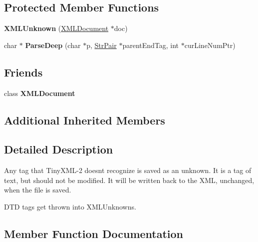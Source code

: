 \subsection*{Protected Member Functions}
\begin{DoxyCompactItemize}
\item 
\mbox{\label{classtinyxml2_1_1_x_m_l_unknown_a9391eb679598d50baba424e6f1aa367b}} 
{\bfseries X\+M\+L\+Unknown} (\mbox{\hyperlink{classtinyxml2_1_1_x_m_l_document}{X\+M\+L\+Document}} $\ast$doc)
\item 
\mbox{\label{classtinyxml2_1_1_x_m_l_unknown_aefc332cc1e6e25736f364d1e5eeb31fe}} 
char $\ast$ {\bfseries Parse\+Deep} (char $\ast$p, \mbox{\hyperlink{classtinyxml2_1_1_str_pair}{Str\+Pair}} $\ast$parent\+End\+Tag, int $\ast$cur\+Line\+Num\+Ptr)
\end{DoxyCompactItemize}
\subsection*{Friends}
\begin{DoxyCompactItemize}
\item 
\mbox{\label{classtinyxml2_1_1_x_m_l_unknown_a4eee3bda60c60a30e4e8cd4ea91c4c6e}} 
class {\bfseries X\+M\+L\+Document}
\end{DoxyCompactItemize}
\subsection*{Additional Inherited Members}


\subsection{Detailed Description}
Any tag that Tiny\+X\+M\+L-\/2 doesn\textquotesingle{}t recognize is saved as an unknown. It is a tag of text, but should not be modified. It will be written back to the X\+ML, unchanged, when the file is saved.

D\+TD tags get thrown into X\+M\+L\+Unknowns. 

\subsection{Member Function Documentation}
\mbox{\label{classtinyxml2_1_1_x_m_l_unknown_a8a06b8c82117ca969a432e17a46830fc}} 
